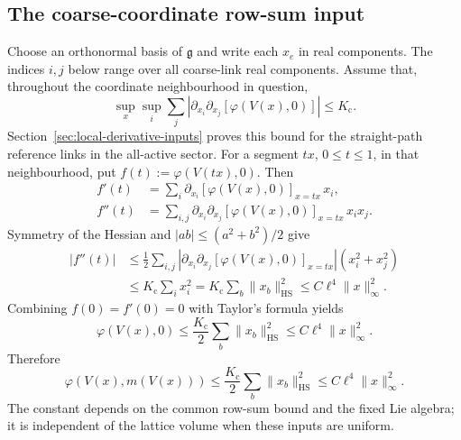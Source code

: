 \documentclass[10pt,reqno]{amsart}
\theoremstyle{definition}
\theoremstyle{remark}
\numberwithin{equation}{section}
\numberwithin{figure}{section}
\newcommand{\g}{\mathfrak g}
\begin{document}
\subsection{The coarse-coordinate row-sum input}
Choose an orthonormal basis of $\g$ and write each $x_e$ in real components.
The indices $i,j$ below range over all coarse-link real components.
Assume that, throughout the coordinate neighbourhood in question,
\begin{equation}\label{eq:coarse-row-sum-input}
\boxed{
\sup_x\sup_i\sum_j
\left|\partial_{x_i}\partial_{x_j}[\varphi(V(x),0)]\right|
\le K_{\mathrm c}.
}
\end{equation}
Section~\ref{sec:local-derivative-inputs} proves this bound for the
straight-path reference links in the all-active sector.
For a segment $tx$, $0\le t\le1$, in that neighbourhood, put
$f(t):=\varphi(V(tx),0)$. Then
\begin{equation}\label{eq:coarse-line-derivatives}
\begin{aligned}
f'(t)&=\sum_i\partial_{x_i}[\varphi(V(x),0)]_{x=tx}\,x_i,\\
f''(t)&=\sum_{i,j}\partial_{x_i}\partial_{x_j}
[\varphi(V(x),0)]_{x=tx}\,x_ix_j.
\end{aligned}
\end{equation}
Symmetry of the Hessian and $|ab|\le(a^2+b^2)/2$ give
\begin{equation}\label{eq:coarse-row-sum-calculation}
\begin{aligned}
|f''(t)|
&\le\frac12\sum_{i,j}
\left|\partial_{x_i}\partial_{x_j}[\varphi(V(x),0)]_{x=tx}\right|
(x_i^2+x_j^2)\\
&\le K_{\mathrm c}\sum_i x_i^2
=K_{\mathrm c}\sum_b\|x_b\|_{\mathrm{HS}}^2
\le C\ell^4\|x\|_\infty^2.
\end{aligned}
\end{equation}
Combining $f(0)=f'(0)=0$ with Taylor's formula yields
\begin{equation}\label{eq:coarse-reference-energy-bound}
\varphi(V(x),0)\le\frac{K_{\mathrm c}}2\sum_b\|x_b\|_{\mathrm{HS}}^2
\le C\ell^4\|x\|_\infty^2.
\end{equation}
Therefore
\begin{equation}\label{eq:coarse-stationary-energy-bound}
\varphi(V(x),m(V(x)))\le\frac{K_{\mathrm c}}2\sum_b\|x_b\|_{\mathrm{HS}}^2
\le C\ell^4\|x\|_\infty^2.
\end{equation}
The constant depends on the common row-sum bound and the fixed Lie algebra;
it is independent of the lattice volume when these inputs are uniform.
\end{document}
